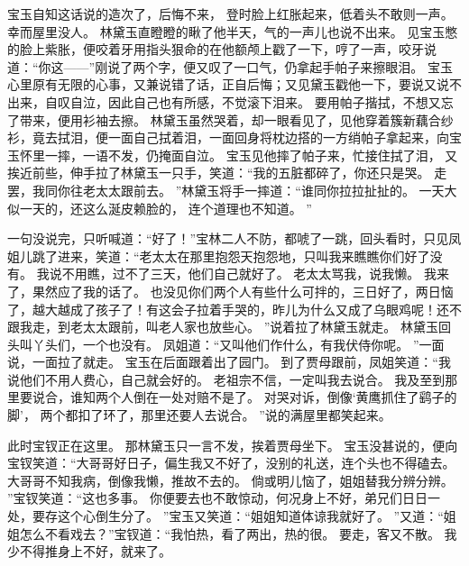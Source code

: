 宝玉自知这话说的造次了，后悔不来，
登时脸上红胀起来，低着头不敢则一声。
幸而屋里没人。
林黛玉直瞪瞪的瞅了他半天，气的一声儿也说不出来。
见宝玉憋的脸上紫胀，便咬着牙用指头狠命的在他额颅上戳了一下，哼了一声，咬牙说道：“你这——”刚说了两个字，便又叹了一口气，仍拿起手帕子来擦眼泪。
宝玉心里原有无限的心事，又兼说错了话，正自后悔；又见黛玉戳他一下，要说又说不出来，自叹自泣，因此自己也有所感，不觉滚下泪来。
要用帕子揩拭，不想又忘了带来，便用衫袖去擦。
林黛玉虽然哭着，却一眼看见了，见他穿着簇新藕合纱衫，竟去拭泪，便一面自己拭着泪，一面回身将枕边搭的一方绡帕子拿起来，向宝玉怀里一摔，一语不发，仍掩面自泣。
宝玉见他摔了帕子来，忙接住拭了泪，
又挨近前些，伸手拉了林黛玉一只手，笑道：“我的五脏都碎了，你还只是哭。
走罢，我同你往老太太跟前去。
”林黛玉将手一摔道：“谁同你拉拉扯扯的。
一天大似一天的，还这么涎皮赖脸的，
连个道理也不知道。
”\par
一句没说完，只听喊道：“好了！”宝林二人不防，都唬了一跳，回头看时，只见凤姐儿跳了进来，笑道：“老太太在那里抱怨天抱怨地，只叫我来瞧瞧你们好了没有。
我说不用瞧，过不了三天，他们自己就好了。
老太太骂我，说我懒。
我来了，果然应了我的话了。
也没见你们两个人有些什么可拌的，三日好了，两日恼了，越大越成了孩子了！有这会子拉着手哭的，昨儿为什么又成了乌眼鸡呢！还不跟我走，到老太太跟前，叫老人家也放些心。
”说着拉了林黛玉就走。
林黛玉回头叫丫头们，一个也没有。
凤姐道：“又叫他们作什么，有我伏侍你呢。
”一面说，一面拉了就走。
宝玉在后面跟着出了园门。
到了贾母跟前，凤姐笑道：“我说他们不用人费心，自己就会好的。
老祖宗不信，一定叫我去说合。
我及至到那里要说合，谁知两个人倒在一处对赔不是了。
对哭对诉，倒像‘黄鹰抓住了鹞子的脚’，
两个都扣了环了，那里还要人去说合。
”说的满屋里都笑起来。
\par
此时宝钗正在这里。
那林黛玉只一言不发，挨着贾母坐下。
宝玉没甚说的，便向宝钗笑道：“大哥哥好日子，偏生我又不好了，没别的礼送，连个头也不得磕去。
大哥哥不知我病，倒像我懒，推故不去的。
倘或明儿恼了，姐姐替我分辨分辨。
”宝钗笑道：“这也多事。
你便要去也不敢惊动，何况身上不好，弟兄们日日一处，要存这个心倒生分了。
”宝玉又笑道：“姐姐知道体谅我就好了。
”又道：“姐姐怎么不看戏去？”宝钗道：“我怕热，看了两出，热的很。
要走，客又不散。
我少不得推身上不好，就来了。
